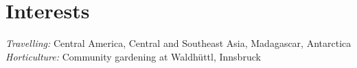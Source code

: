 \documentclass[a4paper]{twentysecondcv} %
\begin{document}




\vspace*{0.7em}



\section{Interests}

\emph{Travelling: }Central America, Central and Southeast Asia, Madagascar, Antarctica\\
\emph{Horticulture: }Community gardening at Waldh\"uttl, Innsbruck\
\end{document}
